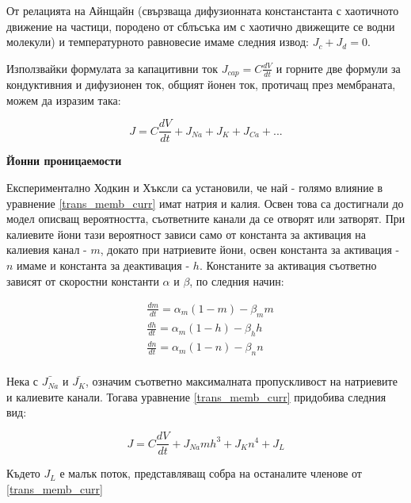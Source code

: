 \documentclass{article}
\numberwithin{equation}{section}
\begin{document}
От релацията на Айнщайн (свързваща дифузионната констанстанта с хаотичното движение на частици, породено от сблъсъка им с хаотично движещите
се водни молекули) и температурното равновесие имаме следния извод: $J_c + J_d = 0$.

Използвайки формулата за капацитивни ток $J_{cap}=C\frac{dV}{dt}$ и горните две формули за кондуктивния и дифузионен ток, общият йонен ток, протичащ през мембраната, можем да изразим така:

\begin{equation}\label{trans_memb_curr}
        J = C\frac{dV}{dt} + J_{Na} + J_{K} + J_{Ca} + ...
    \end{equation}

\vspace{5mm} %
\textbf{Йонни проницаемости}

Експериментално Ходкин и Хъксли са установили, че най - голямо влияние в уравнение \eqref{trans_memb_curr} имат натрия и калия. Освен това
са достигнали до модел описващ вероятността, съответните канали да се отворят или затворят. При калиевите йони тази вероятност зависи само
от константа за активация на калиевия канал - $m$, докато при натриевите йони, освен константа за активация - $n$ имаме и константа за
деактивация - $h$. Констаните за активация съответно зависят от скоростни константи $\alpha$ и $\beta$, по следния начин:

\begin{equation}\label{chanels}
    \begin{aligned}
        &\frac{dm}{dt} = \alpha_m(1-m) - \beta_mm\\
        &\frac{dh}{dt} = \alpha_m(1-h) - \beta_hh\\
        &\frac{dn}{dt} = \alpha_m(1-n) - \beta_nn\\
    \end{aligned}
\end{equation}

Нека с $\bar{J_{Na}}$ и $\bar{J_{K}}$, означим съответно максималната пропускливост на натриевите и калиевите канали. Тогава
уравнение \eqref{trans_memb_curr} придобива следния вид:

\begin{equation}\label{trans_memb_curr_h-h}
    J = C\frac{dV}{dt} + J_{Na}mh^3 + J_{K}n^4 + J_{L}
\end{equation}

Където $J_{L}$ е малък поток, представляващ собра на останалите членове от \eqref{trans_memb_curr}
\end{document}
